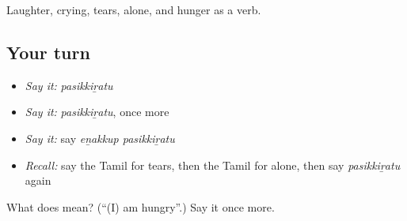 \begin{grammarlens}[title={What you've built}]
Laughter, crying, tears, alone, and hunger as a verb.
\end{grammarlens}

\subsection*{Your turn}
\begin{itemize}
\raggedright
  \item \emph{Say it:} \emph{pasikkiṟatu}
  \item \emph{Say it:} \emph{pasikkiṟatu}, once more
  \item \emph{Say it:} say \emph{eṉakkup pasikkiṟatu}
  \item \emph{Recall:} say the Tamil for tears, then the Tamil for alone, then say \emph{pasikkiṟatu} again
\end{itemize}

\begin{tcolorbox}[breakable,colback=teal!4,colframe=teal!35!black,title={Before you move on}]
What does  mean? (\textquotedblleft{}(I) am hungry\textquotedblright{}.) Say it once more.
\end{tcolorbox}
